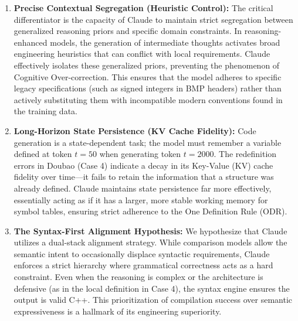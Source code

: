 \documentclass{article}
\theoremstyle{plain}
\theoremstyle{definition}
\theoremstyle{remark}
\begin{document}
\begin{enumerate}
    \item \textbf{Precise Contextual Segregation (Heuristic Control):} 
    The critical differentiator is the capacity of Claude to maintain strict segregation between generalized reasoning priors and specific domain constraints. In reasoning-enhanced models, the generation of intermediate thoughts activates broad engineering heuristics that can conflict with local requirements. Claude effectively isolates these generalized priors, preventing the phenomenon of Cognitive Over-correction. This ensures that the model adheres to specific legacy specifications (such as signed integers in BMP headers) rather than actively substituting them with incompatible modern conventions found in the training data.
    
    \item \textbf{Long-Horizon State Persistence (KV Cache Fidelity):} 
    Code generation is a state-dependent task; the model must remember a variable defined at token $t=50$ when generating token $t=2000$. The redefinition errors in Doubao (Case 4) indicate a decay in its Key-Value (KV) cache fidelity over time—it fails to retain the information that a structure was already defined. Claude maintains state persistence far more effectively, essentially acting as if it has a larger, more stable working memory for symbol tables, ensuring strict adherence to the One Definition Rule (ODR).
    
    \item \textbf{The Syntax-First Alignment Hypothesis:} 
    We hypothesize that Claude utilizes a dual-stack alignment strategy. While comparison models allow the semantic intent to occasionally displace syntactic requirements, Claude enforces a strict hierarchy where grammatical correctness acts as a hard constraint. Even when the reasoning is complex or the architecture is defensive (as in the local definition in Case 4), the syntax engine ensures the output is valid C++. This prioritization of compilation success over semantic expressiveness is a hallmark of its engineering superiority.
\end{enumerate}
\end{document}
